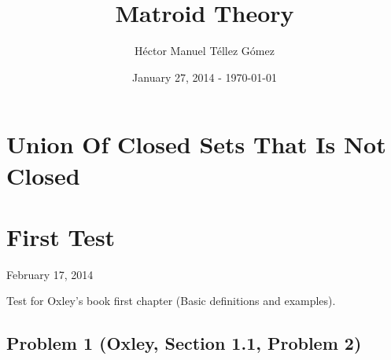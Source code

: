 \frontmatter
\title{Matroid Theory}
\author{Héctor Manuel Téllez Gómez}
\date{January 27, 2014 - \today}
\maketitle

\tableofcontents

\mainmatter


\chapter{Union Of Closed Sets That Is Not Closed}


\chapter{First Test}
    \begin{center} February 17, 2014 \end{center}
    Test for Oxley's book first chapter (Basic definitions and examples). 
    \section{Problem 1 (Oxley, Section 1.1, Problem 2)}
    
